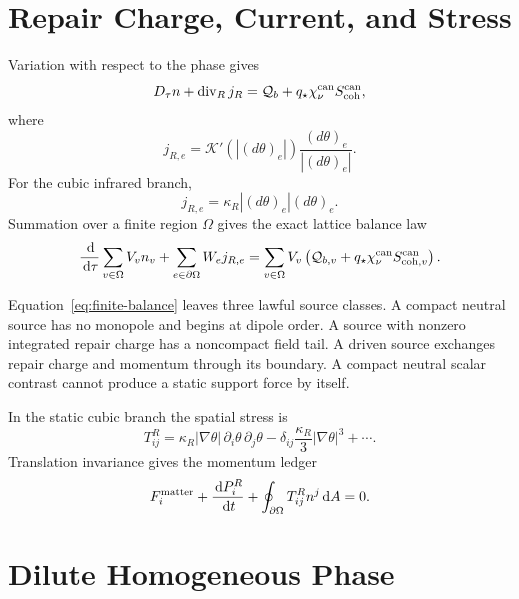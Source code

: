 \documentclass[11pt]{article}
\newcommand{\chican}{\chi_\nu^{\mathrm{can}}}
\newcommand{\dd}{\,\mathrm d}
\begin{document}
\section{Repair Charge, Current, and Stress}

Variation with respect to the phase gives
\begin{equation}
D_\tau n+\operatorname{div}_R j_R
=\mathcal Q_b+q_\star\chican S_{\rm coh}^{\rm can},
\label{eq:gauss}
\end{equation}
where
\begin{equation}
j_{R,e}=\mathcal K'\!\left(|(d\theta)_e|\right)
\frac{(d\theta)_e}{|(d\theta)_e|}.
\end{equation}
For the cubic infrared branch,
\begin{equation}
j_{R,e}=\kappa_R|(d\theta)_e|(d\theta)_e.
\end{equation}
Summation over a finite region \(\Omega\) gives the exact lattice balance law
\begin{equation}
\frac{\dd}{\dd\tau}\sum_{v\in\Omega}V_vn_v
+\sum_{e\in\partial\Omega}W_ej_{R,e}
=\sum_{v\in\Omega}V_v
\left(\mathcal Q_{b,v}+q_\star\chican
S_{{\rm coh},v}^{\rm can}\right).
\label{eq:finite-balance}
\end{equation}

Equation~\eqref{eq:finite-balance} leaves three lawful source classes. A
compact neutral source has no monopole and begins at dipole order. A source
with nonzero integrated repair charge has a noncompact field tail. A driven
source exchanges repair charge and momentum through its boundary. A compact
neutral scalar contrast cannot produce a static support force by itself.

In the static cubic branch the spatial stress is
\begin{equation}
T^R_{ij}=\kappa_R|\nabla\theta|\,
\partial_i\theta\,\partial_j\theta
-\delta_{ij}\frac{\kappa_R}{3}|\nabla\theta|^3+\cdots .
\label{eq:repair-stress}
\end{equation}
Translation invariance gives the momentum ledger
\begin{equation}
F_i^{\rm matter}+\frac{\dd P_i^R}{\dd t}
+\oint_{\partial\Omega}T^R_{ij}n^j\dd A=0.
\label{eq:momentum-ledger}
\end{equation}

\section{Dilute Homogeneous Phase}
\end{document}
